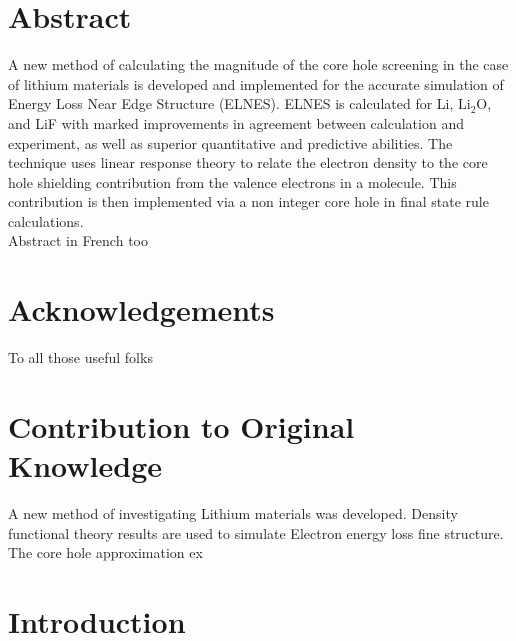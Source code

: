 \documentclass[12pt]{report}
\begin{document}









\chapter*{Abstract}
\renewcommand{\thepage}{\roman{page}}%


A new method of calculating the magnitude of the core hole screening in the case of lithium materials is developed and implemented for the accurate simulation of Energy Loss Near Edge Structure (ELNES).  ELNES is calculated for Li, $\mathrm{Li_2O}$, and LiF with marked improvements in agreement between calculation and experiment, as well as superior quantitative and predictive abilities.   The technique uses linear response theory to relate the electron density to the core hole shielding contribution from the valence electrons in a molecule.  This contribution is then implemented via a non integer core hole in final state rule calculations. 
\\
Abstract in French too

\chapter*{Acknowledgements}
To all those useful folks

\chapter*{Contribution to Original Knowledge}
A new method of investigating Lithium materials was developed.  Density functional theory results are used to simulate Electron energy loss fine structure.  The core hole approximation ex



\tableofcontents

\chapter{Introduction}
\renewcommand{\thepage}{\arabic{page}}%
\setcounter{page}{1}%


\end{document}
